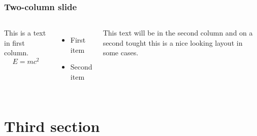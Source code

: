 \documentclass{beamer}
\begin{document}
\begin{frame}
\frametitle{Two-column slide}

\begin{columns}

This is a text in first column.
$$E=mc^2$$
\begin{itemize}
\item First item
\item Second item
\end{itemize}

This text will be in the second column
and on a second tought this is a nice looking
layout in some cases.
\end{columns}
\end{frame}

\section{Third section}




\end{document}
